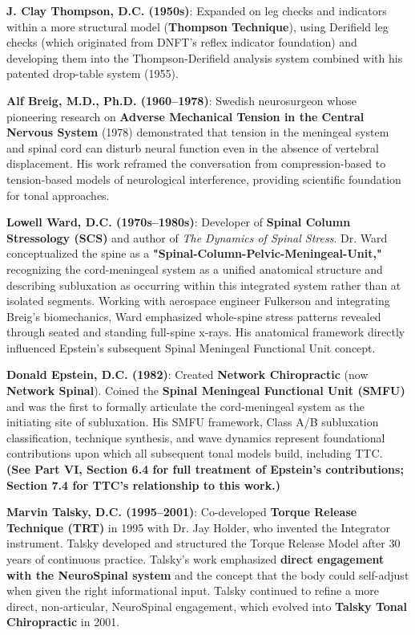 \documentclass[11pt,letterpaper]{article}
\begin{document}
\textbf{J. Clay Thompson, D.C. (1950s)}: Expanded on leg checks and indicators within a more structural model (\textbf{Thompson Technique}), using Derifield leg checks (which originated from DNFT's reflex indicator foundation) and developing them into the Thompson-Derifield analysis system combined with his patented drop-table system (1955).


\textbf{Alf Breig, M.D., Ph.D. (1960–1978)}: Swedish neurosurgeon whose pioneering research on \textbf{Adverse Mechanical Tension in the Central Nervous System} (1978) demonstrated that tension in the meningeal system and spinal cord can disturb neural function even in the absence of vertebral displacement. His work reframed the conversation from compression-based to tension-based models of neurological interference, providing scientific foundation for tonal approaches.


\textbf{Lowell Ward, D.C. (1970s–1980s)}: Developer of \textbf{Spinal Column Stressology (SCS)} and author of \textit{The Dynamics of Spinal Stress}. Dr. Ward conceptualized the spine as a \textbf{"Spinal-Column-Pelvic-Meningeal-Unit,"} recognizing the cord-meningeal system as a unified anatomical structure and describing subluxation as occurring within this integrated system rather than at isolated segments. Working with aerospace engineer Fulkerson and integrating Breig's biomechanics, Ward emphasized whole-spine stress patterns revealed through seated and standing full-spine x-rays. His anatomical framework directly influenced Epstein's subsequent Spinal Meningeal Functional Unit concept.


\textbf{Donald Epstein, D.C. (1982)}: Created \textbf{Network Chiropractic} (now \textbf{Network Spinal}). Coined the \textbf{Spinal Meningeal Functional Unit (SMFU)} and was the first to formally articulate the cord-meningeal system as the initiating site of subluxation. His SMFU framework, Class A/B subluxation classification, technique synthesis, and wave dynamics represent foundational contributions upon which all subsequent tonal models build, including TTC. \textbf{(See Part VI, Section 6.4 for full treatment of Epstein's contributions; Section 7.4 for TTC's relationship to this work.)}


\textbf{Marvin Talsky, D.C. (1995–2001)}: Co-developed \textbf{Torque Release Technique (TRT)} in 1995 with Dr. Jay Holder, who invented the Integrator instrument. Talsky developed and structured the Torque Release Model after 30 years of continuous practice. Talsky's work emphasized \textbf{direct engagement with the NeuroSpinal system} and the concept that the body could self-adjust when given the right informational input. Talsky continued to refine a more direct, non-articular, NeuroSpinal engagement, which evolved into \textbf{Talsky Tonal Chiropractic} in 2001.
\end{document}
